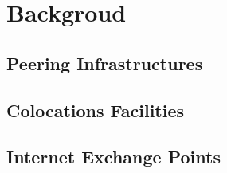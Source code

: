 \chapter{Backgroud}\label{cap:background}
\thispagestyle{empty}

	\section{Peering Infrastructures}
	\label{sec:peering-infra}

	\section{Colocations Facilities}
	\label{sec:colos}

	\section{Internet Exchange Points}
	\label{sec:ixp}
	